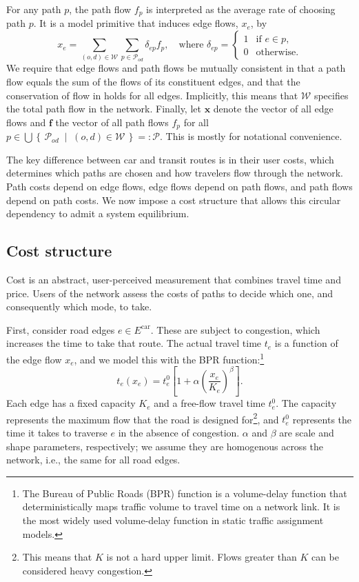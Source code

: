 \documentclass[12pt]{article}
\newcommand{\Ecar}{E^\text{car}}
\newcommand{\W}{\mathcal{W}}
\newcommand{\Pset}{\mathcal{P}}
\newcommand{\POD}{\Pset_{od}}
\newcommand{\set}[2]{\left\{\,#1 \;\middle|\; #2\,\right\}}
\renewcommand{\vec}[1]{\mathbf{#1}}
\begin{document}
For any path $p$, the path flow $f_p$ is interpreted as the average rate of choosing path $p$.
It is a model primitive that induces edge flows, $x_e$, by
\begin{equation}
    \label{eqn:conservation_of_flow}
    x_e = \sum_{(o, d) \in \W} \sum_{p \in \POD} \delta_{ep} f_p, \quad \text{where }
    \delta_{ep} =
    \begin{cases}
        1 &\text{if } e \in p, \\
        0 &\text{otherwise.}
    \end{cases}
\end{equation}
We require that edge flows and path flows be mutually consistent in that a path flow equals the sum of the flows of its constituent edges, and that the conservation of flow in  holds for all edges.
Implicitly, this means that $\W$ specifies the total path flow in the network.
Finally, let $\vec{x}$ denote the vector of all edge flows and $\vec{f}$ the vector of all path flows $f_p$ for all $p \in \bigcup \set{\POD}{(o, d) \in \W} =: \Pset$.
This is mostly for notational convenience.

The key difference between car and transit routes is in their user costs, which determines which paths are chosen and how travelers flow through the network. 
Path costs depend on edge flows, edge flows depend on path flows, and path flows depend on path costs.
We now impose a cost structure that allows this circular dependency to admit a system equilibrium.

\subsection{Cost structure}

Cost is an abstract, user-perceived measurement that combines travel time and price.
Users of the network assess the costs of paths to decide which one, and consequently which mode, to take.

First, consider road edges $e \in \Ecar$.
These are subject to congestion, which increases the time to take that route.
The actual travel time $t_e$ is a function of the edge flow $x_e$, and we model this with the BPR function:\footnote{The Bureau of Public Roads (BPR) function is a volume-delay function that deterministically maps traffic volume to travel time on a network link. It is the most widely used volume-delay function in static traffic assignment models.}
\[
    t_e(x_e) = t_e^0 \left[1 + \alpha \left(\frac{x_e}{K_e}\right)^\beta\right].
\]
Each edge has a fixed capacity $K_e$ and a free-flow travel time $t_e^0$.
The capacity represents the maximum flow that the road is designed for\footnote{This means that $K$ is not a hard upper limit. Flows greater than $K$ can be considered heavy congestion.}, and $t_e^0$ represents the time it takes to traverse $e$ in the absence of congestion.
$\alpha$ and $\beta$ are scale and shape parameters, respectively; we assume they are homogenous across the network, i.e., the same for all road edges.
\end{document}

